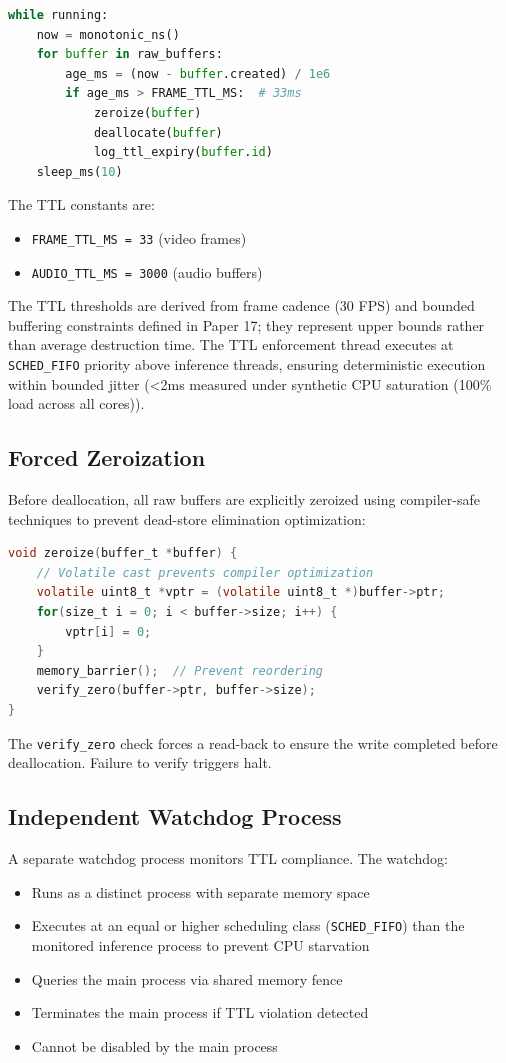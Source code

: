 \documentclass[conference]{IEEEtran}
\begin{document}
\begin{lstlisting}[language=Python, caption={TTL Enforcement Loop}]
while running:
    now = monotonic_ns()
    for buffer in raw_buffers:
        age_ms = (now - buffer.created) / 1e6
        if age_ms > FRAME_TTL_MS:  # 33ms
            zeroize(buffer)
            deallocate(buffer)
            log_ttl_expiry(buffer.id)
    sleep_ms(10)
\end{lstlisting}

The TTL constants are:
\begin{itemize}
    \item \texttt{FRAME\_TTL\_MS = 33} (video frames)
    \item \texttt{AUDIO\_TTL\_MS = 3000} (audio buffers)
\end{itemize}

The TTL thresholds are derived from frame cadence (30 FPS) and bounded buffering constraints defined in Paper 17; they represent upper bounds rather than average destruction time. The TTL enforcement thread executes at \texttt{SCHED\_FIFO} priority above inference threads, ensuring deterministic execution within bounded jitter (<2ms measured under synthetic CPU saturation (100\% load across all cores)).

\subsection{Forced Zeroization}
Before deallocation, all raw buffers are explicitly zeroized using compiler-safe techniques to prevent dead-store elimination optimization:

\begin{lstlisting}[language=C, caption={Zeroization Procedure}]
void zeroize(buffer_t *buffer) {
    // Volatile cast prevents compiler optimization
    volatile uint8_t *vptr = (volatile uint8_t *)buffer->ptr;
    for(size_t i = 0; i < buffer->size; i++) {
        vptr[i] = 0;
    }
    memory_barrier();  // Prevent reordering
    verify_zero(buffer->ptr, buffer->size);
}
\end{lstlisting}

The \texttt{verify\_zero} check forces a read-back to ensure the write completed before deallocation. Failure to verify triggers halt.

\subsection{Independent Watchdog Process}
A separate watchdog process monitors TTL compliance. The watchdog:
\begin{itemize}
    \item Runs as a distinct process with separate memory space
    \item Executes at an equal or higher scheduling class (\texttt{SCHED\_FIFO}) than the monitored inference process to prevent CPU starvation
    \item Queries the main process via shared memory fence
    \item Terminates the main process if TTL violation detected
    \item Cannot be disabled by the main process
\end{itemize}
\end{document}
